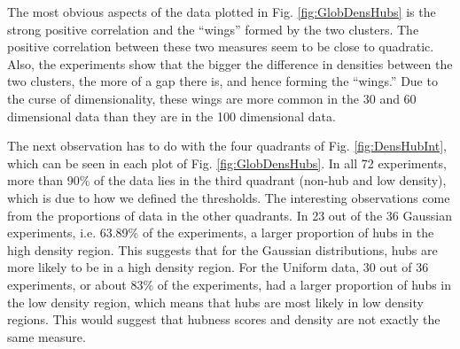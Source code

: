 \documentclass[graybox]{svmult}
\begin{document}
The most obvious aspects of the data plotted in Fig. \ref{fig:GlobDensHubs} is the strong positive correlation and the ``wings'' formed by the two clusters. The positive correlation between these two measures seem to be close to quadratic. Also, the experiments show that the bigger the difference in densities between the two clusters, the more of a gap there is, and hence forming the ``wings.'' Due to the curse of dimensionality, these wings are more common in the 30 and 60 dimensional data than they are in the 100 dimensional data.

The next observation has to do with the four quadrants of Fig. \ref{fig:DensHubInt}, which can be seen in each plot of Fig. \ref{fig:GlobDensHubs}. In all 72 experiments, more than 90\% of the data lies in the third quadrant (non-hub and low density), which is due to how we defined the thresholds. The interesting observations come from the proportions of data in the other quadrants. In 23 out of the 36 Gaussian experiments, i.e. 63.89\% of the experiments, a larger proportion of hubs in the high density region. This suggests that for the Gaussian distributions, hubs are more likely to be in a high density region. For the Uniform data, 30 out of 36 experiments, or about 83\% of the experiments, had a larger proportion of hubs in the low density region, which means that hubs are most likely in low density regions. This would suggest that hubness scores and density are not exactly the same measure.
\end{document}
